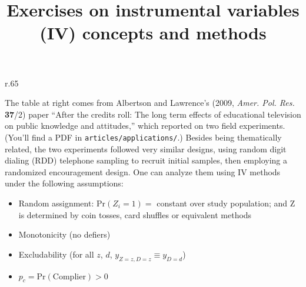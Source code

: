 \documentclass{article}
\title{Exercises on instrumental variables (IV) concepts and methods }
\begin{document}
\maketitle

\begin{minipage}{1.0\linewidth}

\begin{wrapfigure}{r}{.65\linewidth}
\end{wrapfigure}

The table at right comes from Albertson and Lawrence's (2009, \textit{Amer. Pol. Res.} \textbf{37}/2) paper ``After the credits roll: The long term effects of educational television on public knowledge and attitudes,'' which reported on two field experiments. (You'll find a PDF in \texttt{articles/applications/}.)   Besides being thematically related, the two experiments followed very similar designs, using random digit dialing (RDD) telephone sampling to recruit initial samples, then employing a randomized encouragement design.  One can analyze them using IV methods under the following assumptions:

\begin{itemize}
\item Random assignment: $\mathrm{Pr}(Z_{i}=1) = $ constant over study population;  and $\mathrm{Z} $ is determined by coin tosses, card shuffles or equivalent methods
\item Monotonicity (no defiers)
\item Excludability (for all $z$, $d$, $y_{Z=z, D=z} \equiv y_{D=d}$)
\item $p_{c} = \mathrm{Pr}(\mathrm{Complier}) > 0$ 
\end{itemize}
  
\end{minipage}
\vspace{4ex}
\end{document}
